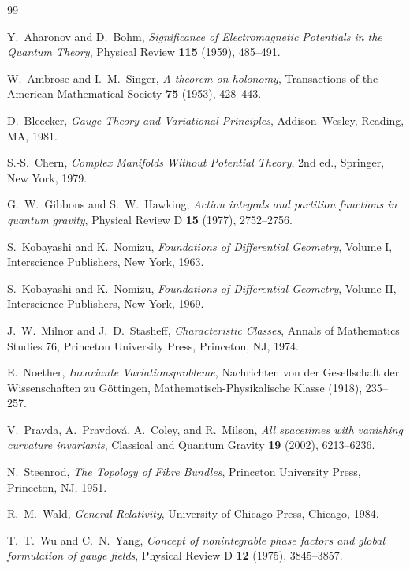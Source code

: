 \documentclass[11pt,a4paper]{article}
\theoremstyle{plain}
\theoremstyle{definition}
\theoremstyle{remark}
\begin{document}
\begin{thebibliography}{99}

Y.~Aharonov and D.~Bohm,
\emph{Significance of Electromagnetic Potentials in the Quantum Theory},
Physical Review \textbf{115} (1959), 485--491.

W.~Ambrose and I.~M.~Singer,
\emph{A theorem on holonomy},
Transactions of the American Mathematical Society \textbf{75} (1953), 428--443.

D.~Bleecker,
\emph{Gauge Theory and Variational Principles},
Addison--Wesley, Reading, MA, 1981.

S.-S.~Chern,
\emph{Complex Manifolds Without Potential Theory},
2nd ed., Springer, New York, 1979.

G.~W.~Gibbons and S.~W.~Hawking,
\emph{Action integrals and partition functions in quantum gravity},
Physical Review D \textbf{15} (1977), 2752--2756.

S.~Kobayashi and K.~Nomizu,
\emph{Foundations of Differential Geometry}, Volume I,
Interscience Publishers, New York, 1963.

S.~Kobayashi and K.~Nomizu,
\emph{Foundations of Differential Geometry}, Volume II,
Interscience Publishers, New York, 1969.

J.~W.~Milnor and J.~D.~Stasheff,
\emph{Characteristic Classes},
Annals of Mathematics Studies 76, Princeton University Press, Princeton, NJ, 1974.

E.~Noether,
\emph{Invariante Variationsprobleme},
Nachrichten von der Gesellschaft der Wissenschaften zu G\"ottingen,
Mathematisch-Physikalische Klasse (1918), 235--257.

V.~Pravda, A.~Pravdov\'a, A.~Coley, and R.~Milson,
\emph{All spacetimes with vanishing curvature invariants},
Classical and Quantum Gravity \textbf{19} (2002), 6213--6236.

N.~Steenrod,
\emph{The Topology of Fibre Bundles},
Princeton University Press, Princeton, NJ, 1951.

R.~M.~Wald,
\emph{General Relativity},
University of Chicago Press, Chicago, 1984.

T.~T.~Wu and C.~N.~Yang,
\emph{Concept of nonintegrable phase factors and global formulation of gauge fields},
Physical Review D \textbf{12} (1975), 3845--3857.


\end{thebibliography}
\end{document}
